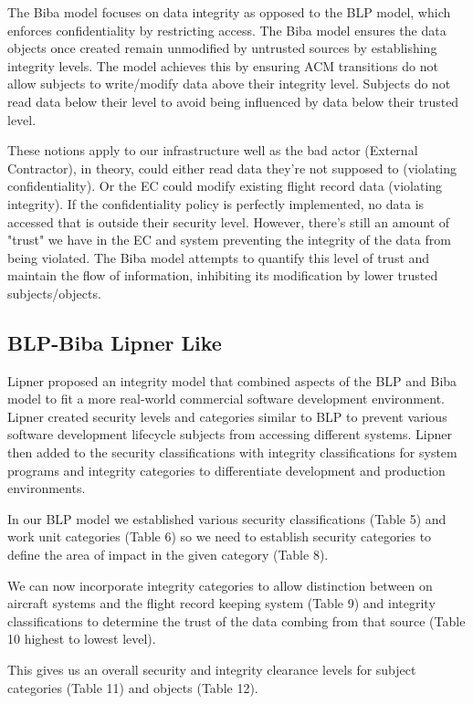 \documentclass[10pt,journal,compsoc]{IEEEtran}
\begin{document}
The Biba model focuses on data integrity as opposed to the BLP model, which enforces confidentiality by restricting access. The Biba model ensures the data objects once created remain unmodified by untrusted sources by establishing integrity levels. 
The model achieves this by ensuring ACM transitions do not allow subjects to write/modify data above their integrity level. Subjects do not read data below their level to avoid being influenced by data below their trusted level. 

These notions apply to our infrastructure well as the bad actor (External Contractor), in theory, could either read data they're not supposed to (violating confidentiality). Or the EC could modify existing flight record data (violating integrity). If the confidentiality policy is perfectly implemented, no data is accessed that is outside their security level. However, there's still an amount of "trust" we have in the EC and system preventing the integrity of the data from being violated. The Biba model attempts to quantify this level of trust and maintain the flow of information, inhibiting its modification by lower trusted subjects/objects. 

\subsection{BLP-Biba Lipner Like}

Lipner proposed an integrity model that combined aspects of the BLP and Biba model to fit a more real-world commercial software development environment. Lipner created security levels and categories similar to BLP to prevent various software development lifecycle subjects from accessing different systems. Lipner then added to the security classifications with integrity classifications for system programs and integrity categories to differentiate development and production environments. 

In our BLP model we established various security classifications (Table 5) and work unit categories (Table 6) so we need to establish security categories to define the area of impact in the given category (Table 8).

We can now incorporate integrity categories to allow distinction between on aircraft systems and the flight record keeping system (Table 9) and integrity classifications to determine the trust of the data combing from that source (Table 10 highest to lowest level).  

This gives us an overall security and integrity clearance levels for subject categories (Table 11) and objects (Table 12). 
\end{document}
